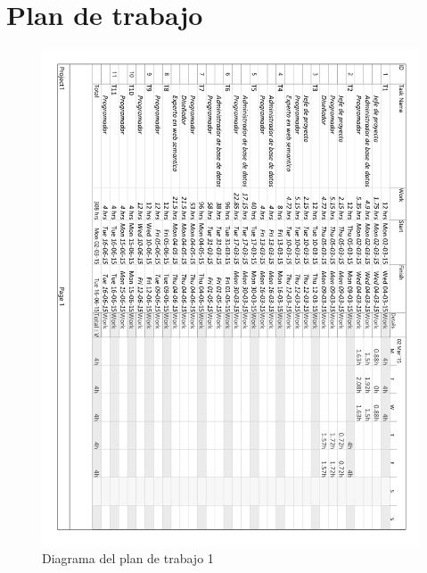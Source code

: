 \clearpage

\section{Plan de trabajo}

\begin{figure}[!htp]
	\centering
	\includegraphics[page=1, scale=.8]{fig/real_work_plan_diagram}
	\caption{Diagrama del plan de trabajo 1}
\end{figure}

